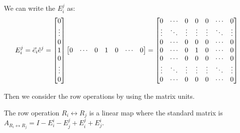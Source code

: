 \documentclass[
	11pt, %
	fleqn, %
	a4paper, %
]{LegrandOrangeBook}
\newcommand{\mypoint}[2]{\tikz[remember picture]{\node[inner sep=0, anchor=base](#1){$#2$};}}
\begin{document}
We can write the $E_i^j$ as:
\vspace{6ex}
\[
    E_i^j = \vec{e}_i \hat{e}^j = \begin{bmatrix}
        0 \\
        \vdots \\
        0 \\
        1 \\
        0 \\
        \vdots \\
        0
    \end{bmatrix} \begin{bmatrix}
        0 & \cdots & 0 & 1 & 0 & \cdots & 0
    \end{bmatrix} = \begin{bmatrix}
        0 & \cdots & 0 & \mypoint{herei}{0} & 0 & \cdots & 0 \\
        \vdots & \ddots & \vdots & \vdots & \vdots & \ddots & \vdots \\
        0 & \cdots & 0 & 0 & 0 & \cdots & 0 \\
        0 & \cdots & 0 & 1 & 0 & \cdots & \mypoint{herej}{0} \\
        0 & \cdots & 0 & 0 & 0 & \cdots & 0 \\
        \vdots & \ddots & \vdots & \vdots & \vdots & \ddots & \vdots \\
        0 & \cdots & 0 & 0 & 0 & \cdots & 0 \\
    \end{bmatrix}
\]

Then we consider the row operations by using the matrix units.

\begin{proposition}
    The row operation $R_i \leftrightarrow R_j$ is a linear map where the standard matrix is $A_{R_i \leftrightarrow R_j} = I - E_i^i - E_j^j + E_i^j + E_j^i$.
\end{proposition}
\end{document}
